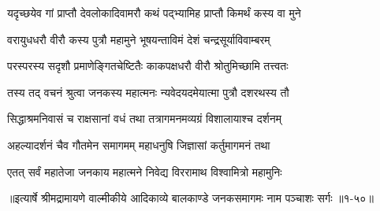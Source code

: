 \twolineshloka
{यदृच्छयेव गां प्राप्तौ देवलोकादिवामरौ}
{कथं पद्भ्यामिह प्राप्तौ किमर्थं कस्य वा मुने} %

\twolineshloka
{वरायुधधरौ वीरौ कस्य पुत्रौ महामुने}
{भूषयन्ताविमं देशं चन्द्रसूर्याविवाम्बरम्} %

\twolineshloka
{परस्परस्य सदृशौ प्रमाणेङ्गितचेष्टितैः}
{काकपक्षधरौ वीरौ श्रोतुमिच्छामि तत्त्वतः} %

\twolineshloka
{तस्य तद् वचनं श्रुत्वा जनकस्य महात्मनः}
{न्यवेदयदमेयात्मा पुत्रौ दशरथस्य तौ} %

\twolineshloka
{सिद्धाश्रमनिवासं च राक्षसानां वधं तथा}
{तत्रागमनमव्यग्रं विशालायाश्च दर्शनम्} %

\twolineshloka
{अहल्यादर्शनं चैव गौतमेन समागमम्}
{महाधनुषि जिज्ञासां कर्तुमागमनं तथा} %

\twolineshloka
{एतत् सर्वं महातेजा जनकाय महात्मने}
{निवेद्य विररामाथ विश्वामित्रो महामुनिः} %


॥इत्यार्षे श्रीमद्रामायणे वाल्मीकीये आदिकाव्ये बालकाण्डे जनकसमागमः नाम पञ्चाशः सर्गः ॥१-५०॥
